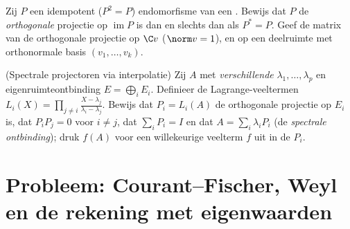 \begin{exercise}[$\star\star$]\label{exo:b2:hermitian:11}
Zij $P$ een idempotent ($P^2 = P$) endomorfisme van een
. Bewijs dat $P$ de \emph{orthogonale} projectie
op $\operatorname{im} P$ is dan en slechts dan als $P^* = P$. Geef
de matrix van de orthogonale projectie op $\C v$ ($\norm v = 1$),
en op een deelruimte met orthonormale basis $(v_1, \dots, v_k)$.
\end{exercise}

\begin{exercise}[$\star\star\star$]\label{exo:b2:hermitian:12}
(Spectrale projectoren via interpolatie) Zij $A$  met
\emph{verschillende}  $\lambda_1, \dots, \lambda_p$ en
eigenruimteontbinding $E = \bigoplus_i E_i$. Definieer de
Lagrange-veeltermen $L_i(X) = \prod_{j\neq i}\frac{X -
\lambda_j}{\lambda_i - \lambda_j}$. Bewijs dat $P_i = L_i(A)$ de
orthogonale projectie op $E_i$ is, dat $P_iP_j = 0$ voor $i \neq
j$, dat $\sum_i P_i = I$ en dat $A = \sum_i \lambda_iP_i$ (de
\emph{spectrale ontbinding}); druk $f(A)$ voor een willekeurige
veelterm $f$ uit in de $P_i$.
\end{exercise}

\section{Probleem: Courant--Fischer, Weyl en de rekening met
eigenwaarden}

